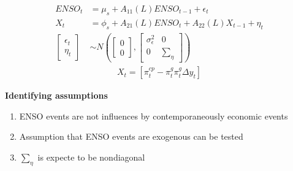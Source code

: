 \documentclass{beamer}
\begin{document}
\begin{frame}
  \begin{align}
    ENSO_t &= \mu_s +A_{11}(L)ENSO_{t-1} + \epsilon_t\\ \nonumber
    X_t &= \phi_s + A_{21}(L)ENSO_t + A_{22}(L)X_{t-1} + \eta_t\\
    \begin{bmatrix}      \epsilon_t \\ \eta_t    \end{bmatrix}
    &\sim N \left ( \begin{bmatrix} 0 \\ 0 \end{bmatrix},
    \begin{bmatrix} \sigma^2_{\epsilon} & 0 \\ 0 & \sum_{\eta} \end{bmatrix}
     \right)
  \end{align}
  \begin{align}
    X_t=[\pi^{cp}_t-\pi^g_t \pi^g_t \Delta y_t]
  \end{align}
\end{frame}

\begin{frame}
  \textbf{Identifying assumptions}
  \begin{enumerate}
    \item ENSO events are not influences by contemporaneously economic events
    \item Assumption that ENSO events are exogenous can be tested
    \item $\sum_{\eta}$ is expecte to be nondiagonal
  \end{enumerate}
\end{frame}
\end{document}
